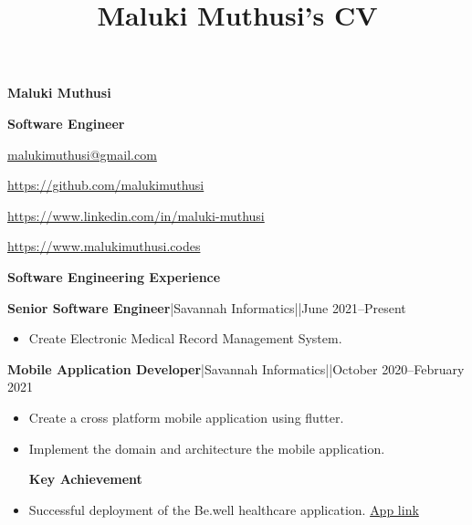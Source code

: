 \documentclass[a4paper]{article}
\begin{document}
\title{Maluki Muthusi's CV}

\begin{center}
    {\Large \textbf{Maluki Muthusi}} \par

    {\large \textbf{Software Engineer}}
\end{center}

\begin{description}[noitemsep]
    \item[\textbf{Email:}] \href{mailto:malukimuthusi@gmail.com}{malukimuthusi@gmail.com}
    \item[\textbf{Github:}] \url{https://github.com/malukimuthusi}
        \item[\textbf{LinkedIn:}]\url{https://www.linkedin.com/in/maluki-muthusi}
        \item[\textbf{Website:}]\url{https://www.malukimuthusi.codes}
\end{description}


\begin{center}
    {\Large \textbf{Software Engineering Experience}}
\end{center}

\textbf{Senior Software Engineer}|Savannah Informatics||June 2021--Present

\begin{itemize}[noitemsep]
    \item Create Electronic Medical Record Management System.
\end{itemize}

\textbf{Mobile Application Developer}|Savannah Informatics||October 2020--February 2021

\begin{itemize}[noitemsep]
    \item Create a cross platform mobile application using flutter.
    \item Implement the domain and architecture the mobile application.
          \begin{center}
              \textbf{Key Achievement}
          \end{center}
    \item Successful deployment of the Be.well healthcare application. \href{https://play.google.com/store/apps/details?id=com.savannah.bewell}{App link}
\end{itemize}
\end{document}

